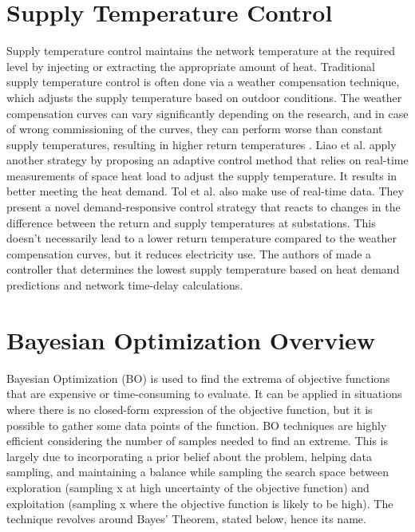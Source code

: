 
\section{Supply Temperature Control}
Supply temperature control maintains the network temperature at the required level by injecting or extracting the appropriate amount of heat. Traditional supply temperature control is often done via a weather compensation technique, which adjusts the supply temperature based on outdoor conditions. The weather compensation curves can vary significantly depending on the research, and in case of wrong commissioning of the curves, they can perform worse than constant supply temperatures, resulting in higher return temperatures \cite{app15062982, LIAO200555}. Liao et al. \cite{LIAO200555} apply another strategy by proposing an adaptive control method that relies on real-time measurements of space heat load to adjust the supply temperature. It results in better meeting the heat demand. Tol et al. \cite{TOL2021105} also make use of real-time data. They present a novel demand-responsive control strategy that reacts to changes in the difference between the return and supply temperatures at substations. This doesn't necessarily lead to a lower return temperature compared to the weather compensation curves, but it reduces electricity use. The authors of \cite{papaKonstantikou} made a controller that determines the lowest supply temperature based on heat demand predictions and network time-delay calculations. 


\section{Bayesian Optimization Overview}

Bayesian Optimization (BO) is used to find the extrema of objective functions that are expensive or time-consuming to evaluate. It can be applied in situations where there is no closed-form expression of the objective function, but it is possible to gather some data points of the function. BO techniques are highly efficient considering the number of samples needed to find an extreme. This is largely due to incorporating a prior belief about the problem, helping data sampling, and maintaining a balance while sampling the search space between exploration (sampling x at high uncertainty of the objective function) and exploitation (sampling x where the objective function is likely to be high). The technique revolves around Bayes' Theorem, stated below, hence its name. 

